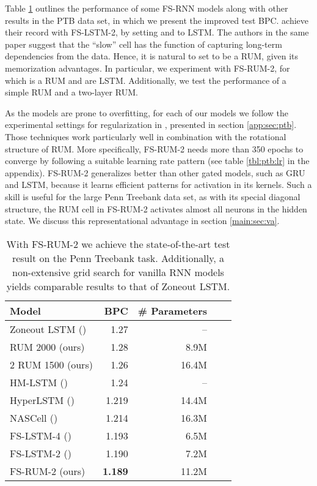 \documentclass{article} \usepackage{iclr2018_conference,times}
\begin{document}
Table \ref{tbl:ptb} outlines the performance of some FS-RNN models along with other results in the PTB data set, in which we present the improved test BPC. \cite{mujika2017ptb} achieve their record with FS-LSTM-2, by setting  and  to LSTM. The authors in the same paper suggest that the ``slow'' cell has the function of capturing long-term dependencies from the data. Hence, it is natural to set  to be a RUM, given its memorization advantages. In particular, we experiment with FS-RUM-2, for which  is a RUM and  are LSTM. Additionally, we test the performance of a simple RUM and a two-layer RUM. 

As the models are prone to overfitting, for each of our models we follow the experimental settings for regularization in \cite{mujika2017ptb}, presented in section \ref{app:sec:ptb}. Those techniques work particularly well in combination with the rotational structure of RUM. More specifically, FS-RUM-2 needs more than 350 epochs to converge by following a suitable learning rate pattern (see table \ref{tbl:ptb:lr} in the appendix). FS-RUM-2 generalizes better than other gated models, such as GRU and LSTM, because it learns efficient patterns for activation in its kernels. Such a skill is useful for the large Penn Treebank data set, as with its special diagonal structure, the RUM cell in FS-RUM-2 activates almost all neurons in the hidden state. We discuss this representational advantage in section \ref{main:sec:va}.



\begin{table}[h!]
\begin{center}
\begin{tabular}{lrrr|r}
\toprule
Model  & BPC & \# Parameters \\ 
\hline
Zoneout LSTM (\cite{krueger2016zoneout}) & 1.27  & -- \\
RUM 2000 (ours)  & 1.28 & 8.9M \\ 
2  RUM 1500 (ours) & 1.26 & 16.4M \\\hline
HM-LSTM  (\cite{chung2016ptb}) & 1.24 & -- \\
HyperLSTM (\cite{ha2016ptb}) & 1.219 & 14.4M \\
NASCell (\cite{zoph2017ptb}) & 1.214 & 16.3M \\
FS-LSTM-4 (\cite{mujika2017ptb}) & 1.193 & 6.5M \\
FS-LSTM-2 (\cite{mujika2017ptb}) & 1.190 & 7.2M \\
\hline
FS-RUM-2 (ours) & \textbf{1.189}  & 11.2M \\
\bottomrule
\end{tabular}
\caption{With FS-RUM-2 we achieve the state-of-the-art test result on the Penn Treebank task. Additionally, a non-extensive grid search for vanilla RNN models yields comparable results to that of Zoneout LSTM.}
\label{tbl:ptb}
\end{center}
\end{table}
\end{document}
